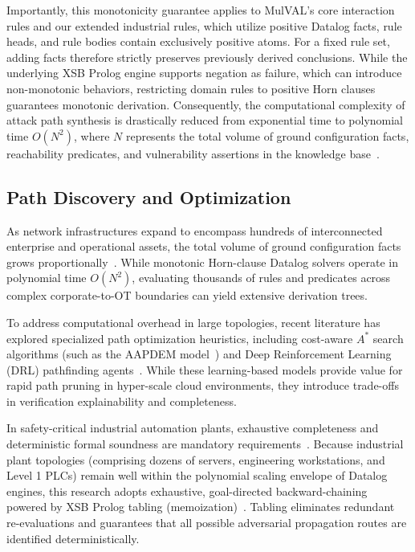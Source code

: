\documentclass[target=mst,aauheader=aics,style=]{thud}
\begin{document}
Importantly, this monotonicity guarantee applies to MulVAL's core interaction rules and our extended industrial rules, which utilize positive Datalog facts, rule heads, and rule bodies contain exclusively positive atoms. For a fixed rule set, adding facts therefore strictly preserves previously derived conclusions. While the underlying XSB Prolog engine supports negation as failure, which can introduce non-monotonic behaviors, restricting domain rules to positive Horn clauses guarantees monotonic derivation. Consequently, the computational complexity of attack path synthesis is drastically reduced from exponential time to polynomial time $O(N^2)$, where $N$ represents the total volume of ground configuration facts, reachability predicates, and vulnerability assertions in the knowledge base~\cite{Ou05}.

\subsection{Path Discovery and Optimization}
\label{sec:path_discovery_opt}
As network infrastructures expand to encompass hundreds of interconnected enterprise and operational assets, the total volume of ground configuration facts grows proportionally~\cite{AbdellatifAAPDEM}. While monotonic Horn-clause Datalog solvers operate in polynomial time $O(N^2)$, evaluating thousands of rules and predicates across complex corporate-to-OT boundaries can yield extensive derivation trees.

To address computational overhead in large topologies, recent literature has explored specialized path optimization heuristics, including cost-aware $A^*$ search algorithms (such as the AAPDEM model~\cite{AbdellatifAAPDEM}) and Deep Reinforcement Learning (DRL) pathfinding agents~\cite{WachterSurvey}. While these learning-based models provide value for rapid path pruning in hyper-scale cloud environments, they introduce trade-offs in verification explainability and completeness.

In safety-critical industrial automation plants, exhaustive completeness and deterministic formal soundness are mandatory requirements~\cite{SunderOT}. Because industrial plant topologies (comprising dozens of servers, engineering workstations, and Level 1 PLCs) remain well within the polynomial scaling envelope of Datalog engines, this research adopts exhaustive, goal-directed backward-chaining powered by XSB Prolog tabling (memoization)~\cite{swift2012xsb}. Tabling eliminates redundant re-evaluations and guarantees that all possible adversarial propagation routes are identified deterministically.
\end{document}
